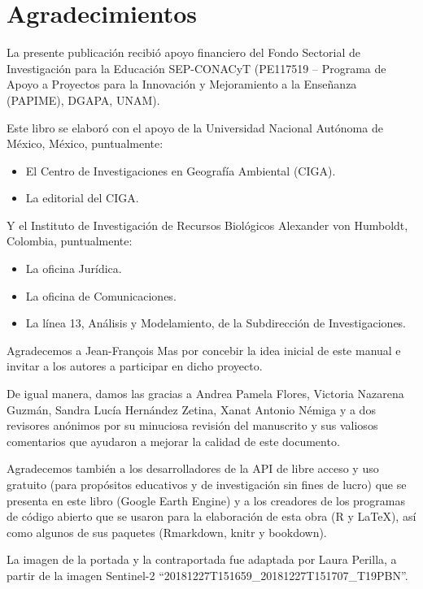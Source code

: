 \documentclass[
  12pt,
  letterpaper,
  twoside]{book}
\providecommand{\tightlist}{%
  \setlength{\itemsep}{0pt}\setlength{\parskip}{0pt}}
\begin{document}
\newpage

\hypertarget{agradecimientos}{%
\chapter*{Agradecimientos}\label{agradecimientos}}

La presente publicación recibió apoyo financiero del Fondo Sectorial de Investigación para la Educación SEP-CONACyT (PE117519 -- Programa de Apoyo a Proyectos para la Innovación y Mejoramiento a la Enseñanza (PAPIME), DGAPA, UNAM).

Este libro se elaboró con el apoyo de la Universidad Nacional Autónoma de México, México, puntualmente:

\begin{itemize}
\tightlist
\item
  El Centro de Investigaciones en Geografía Ambiental (CIGA).
\item
  La editorial del CIGA.
\end{itemize}

Y el Instituto de Investigación de Recursos Biológicos Alexander von Humboldt, Colombia, puntualmente:

\begin{itemize}
\tightlist
\item
  La oficina Jurídica.
\item
  La oficina de Comunicaciones.
\item
  La línea 13, Análisis y Modelamiento, de la Subdirección de Investigaciones.
\end{itemize}

Agradecemos a Jean-François Mas por concebir la idea inicial de este manual e invitar a los autores a participar en dicho proyecto.

De igual manera, damos las gracias a Andrea Pamela Flores, Victoria Nazarena Guzmán, Sandra Lucía Hernández Zetina, Xanat Antonio Némiga y a dos revisores anónimos por su minuciosa revisión del manuscrito y sus valiosos comentarios que ayudaron a mejorar la calidad de este documento.

Agradecemos también a los desarrolladores de la API de libre acceso y uso gratuito (para propósitos educativos y de investigación sin fines de lucro) que se presenta en este libro (Google Earth Engine) y a los creadores de los programas de código abierto que se usaron para la elaboración de esta obra (R y LaTeX), así como algunos de sus paquetes (Rmarkdown, knitr y bookdown).

La imagen de la portada y la contraportada fue adaptada por Laura Perilla, a partir de la imagen Sentinel-2 ``20181227T151659\_20181227T151707\_T19PBN''.
\end{document}
